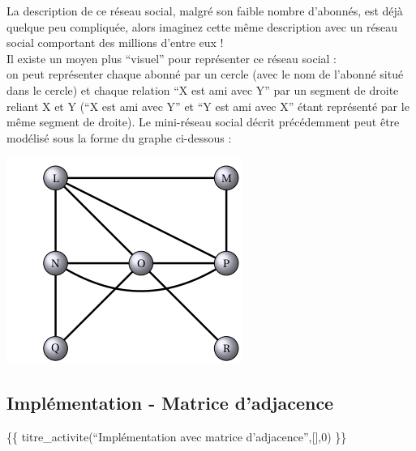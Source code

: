 \documentclass[
  letterpaper,
  DIV=11,
  numbers=noendperiod]{scrartcl}
\begin{document}
La description de ce réseau social, malgré son faible nombre d'abonnés,
est déjà quelque peu compliquée, alors imaginez cette même description
avec un réseau social comportant des millions d'entre eux !\\
Il existe un moyen plus ``visuel'' pour représenter ce réseau social :\\
on peut représenter chaque abonné par un cercle (avec le nom de l'abonné
situé dans le cercle) et chaque relation ``X est ami avec Y'' par un
segment de droite reliant X et Y (``X est ami avec Y'' et ``Y est ami
avec X'' étant représenté par le même segment de droite). Le mini-réseau
social décrit précédemment peut être modélisé sous la forme du graphe
ci-dessous :

\includegraphics{data/graphe14.png}

\hypertarget{impluxe9mentation---matrice-dadjacence}{%
\subsection{Implémentation - Matrice
d'adjacence}\label{impluxe9mentation---matrice-dadjacence}}

\{\{ titre\_activite(``Implémentation avec matrice
d'adjacence'',{[}{]},0) \}\}
\end{document}
